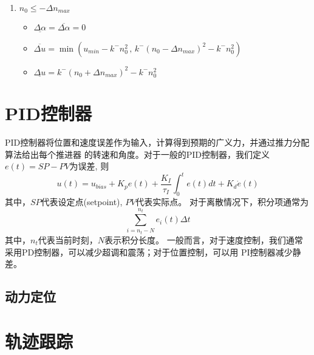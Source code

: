 \begin{enumerate}
  \item $n_0 \leq -\Delta n_{max}$
  \begin{itemize}
    \item $\underline{\Delta \alpha} = \overline{\Delta \alpha} = 0$
    \item $\overline{\Delta u}= \min \left( u_{min}-k^- n_0^2 \, , \,
    k^- (n_0 - \Delta n_{max})^2 - k^- n_0^2 \right)$
    \item $\underline{\Delta u}=k^- (n_0 + \Delta n_{max})^2 - k^- n_0^2 $
  \end{itemize}
\end{enumerate}

\section{PID控制器}
PID控制器将位置和速度误差作为输入，计算得到预期的广义力，并通过推力分配算法给出每个推进器
的转速和角度。对于一般的PID控制器，我们定义$e(t) = SP - PV$为误差, 则
\begin{equation}
    u(t)= u_{bias} + K_p e(t)+ \frac{K_I}{\tau_I} \int_0^t e(t) dt + K_d \dot{e}(t)
\end{equation}
其中，$SP$代表设定点(setpoint), $PV$代表实际点。
对于离散情况下，积分项通常为
\begin{equation}
  \sum_{i=n_t - N}^{n_t} e_i(t) \Delta t
\end{equation}
其中，$n_t$代表当前时刻，$N$表示积分长度。
一般而言，对于速度控制，我们通常采用PD控制器，可以减少超调和震荡；对于位置控制，可以用
PI控制器减少静差。

\subsection{动力定位}

\section{轨迹跟踪}

